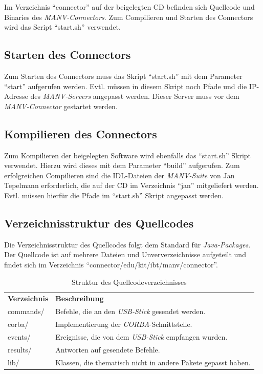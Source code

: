     Im Verzeichnis "`connector"' auf der beigelegten CD befinden sich
    Quellcode und Binaries des \emph{MANV-Connectors}. Zum Compilieren
    und Starten des Connectors wird das Script "`start.sh"' verwendet.

    \subsection{Starten des Connectors}

    Zum Starten des Connectors muss das Skript "`start.sh"' mit dem Parameter
    "`start"' aufgerufen werden. Evtl. müssen in diesem Skript noch Pfade
    und die IP-Adresse des \emph{MANV-Servers} angepasst werden. 
    Dieser Server muss vor dem \emph{MANV-Connector} gestartet werden.

    \subsection{Kompilieren des Connectors}

    Zum Kompilieren der beigelegten Software wird ebenfalls das "`start.sh"'
    Skript verwendet. Hierzu wird dieses mit dem Parameter "`build"' aufgerufen.
    Zum erfolgreichen Compilieren sind die IDL-Dateien der \emph{MANV-Suite}
    von Jan Tepelmann erforderlich, die auf der CD im Verzeichnis "`jan"'
    mitgeliefert werden. Evtl. müssen hierfür die Pfade im "`start.sh"'
    Skript angepasst werden.

    \subsection{Verzeichnisstruktur des Quellcodes}

    Die Verzeichnisstruktur des Quellcodes folgt dem Standard für \emph{Java-Packages}.
    Der Quellcode ist auf mehrere Dateien und Unververzeichnisse aufgeteilt
    und findet sich im Verzeichnis "`connector/edu/kit/ibt/manv/connector"'.
    
    \begin{table}
        \begin{tabular}{ll}
            \textbf{Verzeichnis} & \textbf{Beschreibung}\\

           commands/ & Befehle, die an den \emph{USB-Stick} gesendet werden.\\
           corba/    & Implementierung der \emph{CORBA}-Schnittstelle.\\
           events/   & Ereignisse, die von dem \emph{USB-Stick} empfangen wurden.\\
           results/  & Antworten auf gesendete Befehle.\\
           lib/      & Klassen, die thematisch nicht in andere Pakete gepasst haben.\\
        \end{tabular}
        \caption{Struktur des Quellcodeverzeichnisses}
    \end{table}

